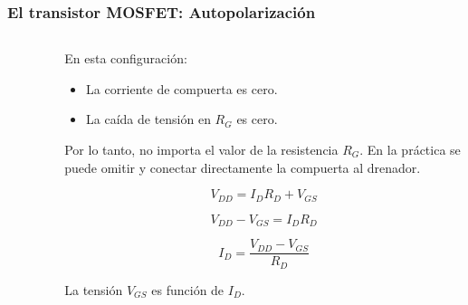 \begin{frame}[t]
    \frametitle{El transistor MOSFET: Autopolarización}

    \begin{columns}
        \begin{column}{0.5\textwidth}
            \begin{figure}[H]
                \centering
            \end{figure}        
        \end{column}
        \begin{column}{0.5\textwidth}
            En esta configuración:
            
            \begin{itemize}
                \item La corriente de compuerta es cero.
                \item La caída de tensión en $R_G$ es cero.
            \end{itemize}

            Por lo tanto, no importa el valor de la resistencia $R_G$. En la práctica se puede omitir y conectar directamente la compuerta al drenador.

            \[ V_{DD} = I_D R_D + V_{GS} \]

            \[ V_{DD} - V_{GS} = I_D R_D \]

            \[ I_D = \dfrac{V_{DD} - V_{GS}}{R_D} \]

            La tensión $V_{GS}$ es función de $I_D$.
        \end{column}
    \end{columns}
\end{frame}

